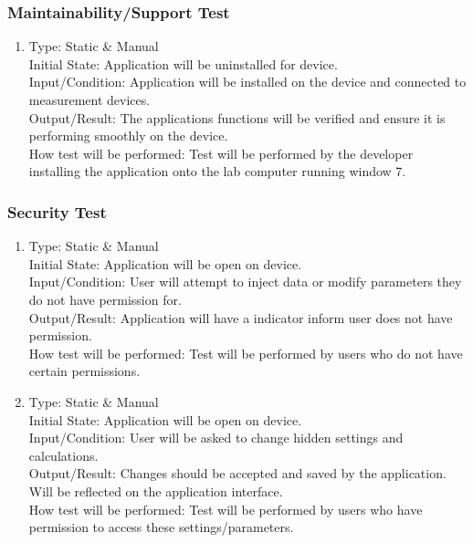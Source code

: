 \documentclass[12pt, titlepage]{article}
\begin{document}
\subsubsection{Maintainability/Support Test}

\begin{adjustwidth}{2.2em}{0pt}
\begin{enumerate}[{NF-MT}1.]
    \item Type: Static \& Manual\\
    Initial State: Application will be uninstalled for device.\\
    Input/Condition: Application will be installed on the device and connected to measurement devices.\\
    Output/Result: The applications functions will be verified and ensure it is performing smoothly on the device.\\
    How test will be performed: Test will be performed by the developer installing the application onto the  lab computer running window 7.
\end{enumerate}
\end{adjustwidth}

\subsubsection{Security Test}

\begin{adjustwidth}{2.2em}{0pt}
\begin{enumerate}[{NF-ST}1.]
    \item Type: Static \& Manual\\
    Initial State: Application will be open on device.\\
    Input/Condition: User will attempt to inject data or modify parameters they do not have permission for.\\
    Output/Result: Application will have a indicator inform user does not have permission.\\
    How test will be performed: Test will be performed by users who do not have certain permissions.
    
    \item Type: Static \& Manual\\
    Initial State: Application will be open on device.\\
    Input/Condition: User will be asked to change hidden settings and calculations.\\
    Output/Result: Changes should be accepted and saved by the application. Will be reflected on the application interface.\\
    How test will be performed: Test will be performed by users who have permission to access these settings/parameters.
\end{enumerate}
\end{adjustwidth}
\end{document}
